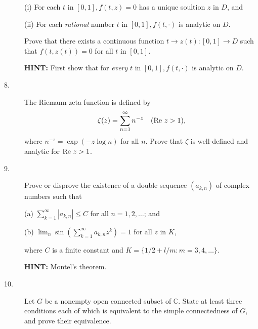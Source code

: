 \documentclass{article}
\def\C{\mathbb C}
\begin{document}
\begin{description}
\item[\quad] (i)
For each $t$ in $[0,1], f(t,z) = 0$ has a unique soultion $z$ in $D$, and

\item[\quad] (ii)
For each {\it rational} number $t$ in $[0,1], f(t, \cdot)$ is
analytic on $D$.

Prove that there exists a continuous function $t \to z(t) : [0,1] \to D$
such that $f(t, z(t)) = 0$ for all $t$ in $[0,1]$.

{\bf HINT:} First show that for {\it every} $t$ in $[0,1], f(t, \cdot)$ is
analytic on $D$.

\item[8.]
The Riemann zeta function is defined by
$$\zeta (z) = \sum^\infty_{n=1} n^{-z} \quad (\hbox{Re\ } z > 1),$$
where $n^{-z} = \exp (-z \log n)$ for all $n$. Prove that $\zeta$ is
well-defined and analytic for $\hbox{Re\ } z >1$.

\item[9.]
Prove or disprove the existence of a double sequence $(a_{k,n})$ of complex
numbers such that

\item[\quad] (a)
$\sum^\infty_{k=1} |a_{k,n} |\leq C$ for all $n = 1,2, \dots$; and

\item[\quad] (b)
$\lim_n \sin \left(\sum^\infty_{k=1} a_{k,n} z^k \right) = 1$
for all $z$ in $K$,

where $C$ is a finite constant and $K = \{ 1/2 + l/m : m = 3,4, \dots\}.$

{\bf HINT:} Montel's theorem.

\item[10.]
Let $G$ be a nonempty open connected subset of $\C$. State at least three
conditions each of which is equivalent to the simple connectedness
of $G$, and prove their equivalence.





\end{description}    
\end{document}
